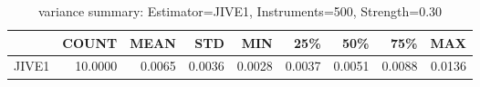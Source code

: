 \begin{table}[ht]
\centering
\caption{variance summary: Estimator=JIVE1, Instruments=500, Strength=0.30}
\begin{tabular}{lrrrrrrrr}
\toprule
 & COUNT & MEAN & STD & MIN & 25\% & 50\% & 75\% & MAX \\
\midrule
JIVE1 & 10.0000 & 0.0065 & 0.0036 & 0.0028 & 0.0037 & 0.0051 & 0.0088 & 0.0136 \\
\bottomrule
\end{tabular}
\end{table}
